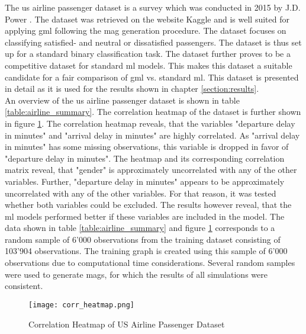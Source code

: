   The \acs{us} airline passenger dataset is a survey which was conducted in 2015
  by J.D. Power \citeyearpar{JDPower2015}. The dataset was retrieved on the 
  website Kaggle \citeyearpar{KAGGLE2015} and is well suited for applying 
  \acs{gml} following the \acs{mag} generation procedure. The dataset focuses on 
  classifying satisfied- and neutral or dissatisfied passengers. The dataset is 
  thus set up for a standard binary classification task. The dataset further 
  proves to be a competitive dataset for standard \acs{ml} models. This makes 
  this dataset a suitable candidate for a fair comparison of \acs{gml} vs. 
  standard \acs{ml}. This dataset is presented in detail as it is used for the 
  results shown in chapter \ref{section:results}. \\

  \noindent An overview of the \acs{us} airline passenger dataset is shown in 
  table \ref{table:airline_summary}. The correlation heatmap of the dataset is
  further shown in figure \ref{fig:corr_heatmap}. The correlation heatmap
  reveals, that the variables "departure delay in minutes" and "arrival delay
  in minutes" are highly correlated. As "arrival delay in minutes" has some
  missing observations, this variable is dropped in favor of "departure delay 
  in minutes". The heatmap and its corresponding correlation matrix reveal,
  that "gender" is approximately uncorrelated with any of the other variables.
  Further, "departure delay in minutes" appears to be approximately uncorrelated 
  with any of the other variables. For that reason, it was tested whether both 
  variables could be excluded. The results however reveal, that the \acs{ml} 
  models performed better if these variables are included in the model. The data 
  shown in table \ref{table:airline_summary} and figure \ref{fig:corr_heatmap} 
  corresponds to a random sample of 6’000 observations from the training dataset 
  consisting of 103’904 observations. The training graph is created using this 
  sample of 6'000 observations due to computational time considerations.
  Several random samples were used to generate \acsp{mag}, for which the
  results of all simulations were consistent.

  \begin{figure}[h]
	  \centering
	  \texttt{[image: corr\_heatmap.png]}
	  \caption{Correlation Heatmap of US Airline Passenger Dataset}
      \label{fig:corr_heatmap}
  \end{figure}

